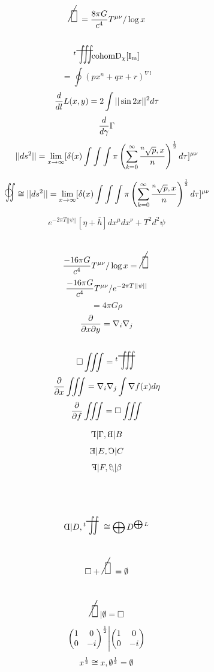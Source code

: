 \documentclass{jsarticle}
\begin{document}
\title{}
\author{}
\date{}
\maketitle

   \newcommand{\oiint}{%
	   \begin{picture}(15,15)
		   \put(0,0){
			   $ \scalebox{1}[2]{$\iint$} $}
		   \put(2,2){$\bigcirc$}
	   \end{picture} %
	   }
   \newcommand{\variint}{%
	\begin{picture}(15,30)
		\put(0,0){
			$ \iint $}
		\put(0,5){\line(15,0){15}}
	\end{picture} %
}

\newcommand{\variiint}{%
	\begin{picture}(15,15)
		\put(0,0){
			$ \iiint $}
		\put(0,5){\line(15,0){20}}
	\end{picture} %
}



 \newcommand{\alearletter}{%
	 \begin{picture}(10,20)
		 \put(0,0){
			 $ \square $}
		 \put(0,0){\line(1,1){10}}
	 \end{picture} %
	 }


  $$ \scalebox{1}[2]{\alearletter} = 
  {{{{8 \pi G} \over {c^4}}T^{\mu\nu}}/ \log x} $$
  $$ {}^{t}\scalebox{1}[2]{\variiint}\mathrm{cohom D_{\chi}[I_m]}$$
  $$ = \oint {(px^n + qx + r)^{\nabla l}} $$
  $$ {d \over d l}L(x,y) = 2 \int ||\sin 2x||^{2}d \tau $$
  $$ {d \over d \gamma}\Gamma $$
 $$ ||ds^2|| = \lim_{x \to \infty} [\delta(x) \int \int \int \pi \left( \sum_{k=0}^{\infty}
		{{}^n\sqrt{p},x \over n} \right)
^{1 \over 2}d \tau]^{\mu\nu} $$

 $$\oiint  \cong  ||ds^2|| = \lim_{x \to \infty} 
 [\delta(x) \int \int \int \pi \left( \sum_{k=0}^{\infty}
		{{}^n\sqrt{p},x \over n} 
		\right)^{1 \over 2}d \tau]^{\mu\nu} $$
 
 $$ e^{-2\pi T||\psi||}[\eta + \bar{h}]dx^{\mu}dx^{\nu} + T^2 d^2 \psi $$
 $$ {{-16 \pi G} \over c^4}T^{\mu\nu}/ \log x =  
 \scalebox{1}[2]{\alearletter} $$
 $${{-16 \pi G} \over c^4}T^{\mu\nu}/ e^{-2\pi T||\psi||} $$
 $$ = 4 \pi G \rho $$
 $$ {\partial \over {\partial x \partial y}} = \nabla_{i} \nabla_{j} $$ 
 $$ \square \iiint  = {}^{t}\scalebox{1}[2]{\variiint}\ $$
 $$ {\partial \over {\partial x}} \iiint = \nabla_{i}\nabla_{j} \int
 \nabla f(x) d \eta $$
 $$ {\partial \over {\partial f}}\iiint = \square \iiint $$

 $$ \reflectbox{$\Gamma$} | \Gamma, \reflectbox{B} | B $$
 $$ \reflectbox{E} | E, \reflectbox{C} | C $$
 $$ \reflectbox{F} | F, \reflectbox{$\beta$} | \beta $$
 $$ \reflectbox{D} | D, {}^{t}\scalebox{1}[2]{\variint} \cong 
 \bigoplus D^{\bigoplus L} $$
 $$ \square +  \scalebox{1}[2]{\alearletter} = \emptyset $$
 $$  \scalebox{1}[2]{\alearletter} | \emptyset = \square $$
 $$ {\begin{pmatrix} 1 & 0 \\
 0 & -i \end{pmatrix}}^{1 \over 2} \Biggl| {\begin{pmatrix} 1 & 0 \\
 0 & -i \end{pmatrix}}$$
 $$ x^{1 \over 2} \cong x, \emptyset^{1 \over 2} = \emptyset$$
\end{document}
